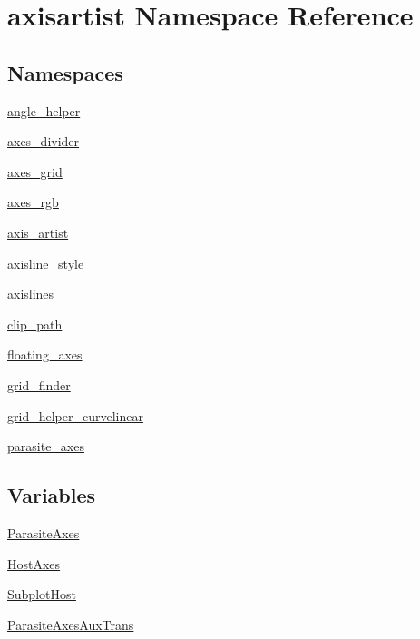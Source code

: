 \hypertarget{namespaceaxisartist}{}\section{axisartist Namespace Reference}
\label{namespaceaxisartist}
\subsection*{Namespaces}
\begin{DoxyCompactItemize}
\item 
 \hyperlink{namespaceaxisartist_1_1angle__helper}{angle\+\_\+helper}
\item 
 \hyperlink{namespaceaxisartist_1_1axes__divider}{axes\+\_\+divider}
\item 
 \hyperlink{namespaceaxisartist_1_1axes__grid}{axes\+\_\+grid}
\item 
 \hyperlink{namespaceaxisartist_1_1axes__rgb}{axes\+\_\+rgb}
\item 
 \hyperlink{namespaceaxisartist_1_1axis__artist}{axis\+\_\+artist}
\item 
 \hyperlink{namespaceaxisartist_1_1axisline__style}{axisline\+\_\+style}
\item 
 \hyperlink{namespaceaxisartist_1_1axislines}{axislines}
\item 
 \hyperlink{namespaceaxisartist_1_1clip__path}{clip\+\_\+path}
\item 
 \hyperlink{namespaceaxisartist_1_1floating__axes}{floating\+\_\+axes}
\item 
 \hyperlink{namespaceaxisartist_1_1grid__finder}{grid\+\_\+finder}
\item 
 \hyperlink{namespaceaxisartist_1_1grid__helper__curvelinear}{grid\+\_\+helper\+\_\+curvelinear}
\item 
 \hyperlink{namespaceaxisartist_1_1parasite__axes}{parasite\+\_\+axes}
\end{DoxyCompactItemize}
\subsection*{Variables}
\begin{DoxyCompactItemize}
\item 
\hyperlink{namespaceaxisartist_ae4d99a2caea9dbf561868b1f89814cef}{Parasite\+Axes}
\item 
\hyperlink{namespaceaxisartist_a286fba185c1a62b1c0b4cf36b6218695}{Host\+Axes}
\item 
\hyperlink{namespaceaxisartist_aa70ccce4828b2adca29edc631ba1b4e9}{Subplot\+Host}
\item 
\hyperlink{namespaceaxisartist_ad039937f6cac4bbd8c10fbbc982fef16}{Parasite\+Axes\+Aux\+Trans}
\end{DoxyCompactItemize}


